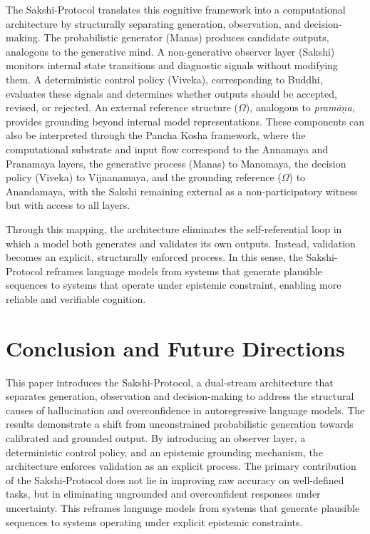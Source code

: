 \documentclass[12pt,a4paper]{article}
\begin{document}
The Sakshi-Protocol translates this cognitive framework into a computational architecture by structurally separating generation, observation, and decision-making. The probabilistic generator (Manas) produces candidate outputs, analogous to the generative mind. A non-generative observer layer (Sakshi) monitors internal state transitions and diagnostic signals without modifying them. A deterministic control policy (Viveka), corresponding to Buddhi, evaluates these signals and determines whether outputs should be accepted, revised, or rejected. An external reference structure ($\Omega$), analogous to \textit{pramāṇa}, provides grounding beyond internal model representations. These components can also be interpreted through the Pancha Kosha framework, where the computational substrate and input flow correspond to the Annamaya and Pranamaya layers, the generative process (Manas) to Manomaya, the decision policy (Viveka) to Vijnanamaya, and the grounding reference ($\Omega$) to Anandamaya, with the Sakshi remaining external as a non-participatory witness but with access to all layers.

Through this mapping, the architecture eliminates the self-referential loop in which a model both generates and validates its own outputs. Instead, validation becomes an explicit, structurally enforced process. In this sense, the Sakshi-Protocol reframes language models from systems that generate plausible sequences to systems that operate under epistemic constraint, enabling more reliable and verifiable cognition.

\section{Conclusion and Future Directions}
This paper introduces the Sakshi-Protocol, a dual-stream architecture that separates generation, observation and decision-making to address the structural causes of hallucination and overconfidence in autoregressive language models. The results demonstrate a shift from unconstrained probabilistic generation towards calibrated and grounded output. By introducing an observer layer, a deterministic control policy, and an epistemic grounding mechanism, the architecture enforces validation as an explicit process. The primary contribution of the Sakshi-Protocol does not lie in improving raw accuracy on well-defined tasks, but in eliminating ungrounded and overconfident responses under uncertainty. This reframes language models from systems that generate plausible sequences to systems operating under explicit epistemic constraints.
\end{document}
